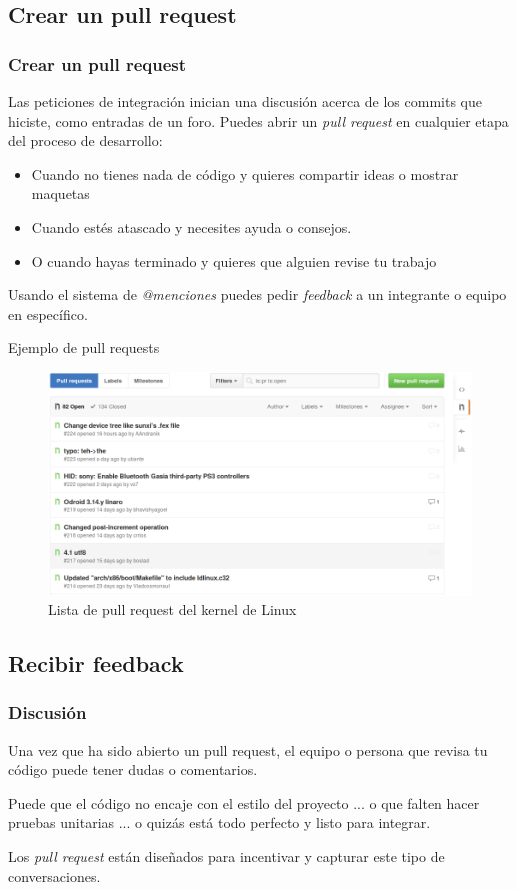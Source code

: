 \documentclass[10pt]{beamer}
\begin{document}
\subsection{Crear un pull request}
\begin{frame}[fragile]
	\frametitle{Crear un pull request}

	Las peticiones de integración inician una discusión acerca de los commits 
	que hiciste, como entradas de un foro. Puedes abrir un \emph{pull request} 
	en cualquier etapa del proceso de desarrollo:
	\begin{itemize}[<+(1)->]
		\item Cuando no tienes nada de código y quieres compartir ideas o 
			mostrar maquetas
		\item Cuando estés atascado y necesites ayuda o consejos.
		\item O cuando hayas terminado y quieres que alguien revise tu trabajo
	\end{itemize}
	\pause
	Usando el sistema de \emph{@menciones} puedes pedir \textit{feedback} a un 
	integrante o equipo en específico.
\end{frame}

\begin{frame}{Ejemplo de pull requests}
	\begin{figure}
		\centering
		\includegraphics[width=\textwidth]{img/pull_requests_linux.png}
		\caption{Lista de pull request del kernel de Linux}
	\end{figure}
\end{frame}

\subsection{Recibir feedback}
\begin{frame}[fragile]
	\frametitle{Discusión}

	Una vez que ha sido abierto un pull request, el equipo o persona que revisa 
	tu código puede tener dudas o comentarios.

	\pause Puede que el código no encaje con el estilo del proyecto \pause... o 
	que falten hacer pruebas unitarias \pause... o quizás está todo perfecto y 
	listo para integrar.
	\pause

	Los \textit{pull request} están diseñados para incentivar y capturar este 
	tipo de conversaciones.
\end{frame}
\end{document}
